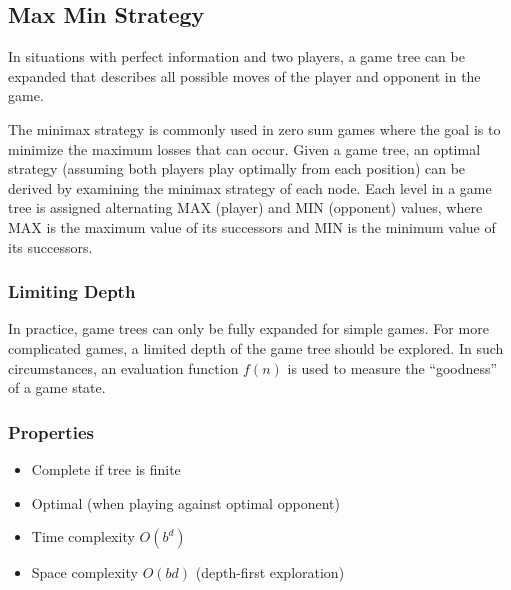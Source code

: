 \documentclass[12pt,titlepage]{article}
\begin{document}
    \subsection{Max Min Strategy}
      In situations with perfect information and two players, a game tree can be expanded that describes all possible moves of the player and opponent
      in the game.

      The minimax strategy is commonly used in zero sum games where the goal is to minimize the maximum losses that can occur. Given a game tree, an
      optimal strategy (assuming both players play optimally from each position) can be derived by examining the minimax strategy of each node. Each
      level in a game tree is assigned alternating MAX (player) and MIN (opponent) values, where MAX is the maximum value of its successors and MIN is the
      minimum value of its successors.

      \subsubsection{Limiting Depth}
        In practice, game trees can only be fully expanded for simple games. For more complicated games, a limited depth of the game tree should be explored.
        In such circumstances, an evaluation function $f(n)$ is used to measure the ``goodness'' of a game state.

      \subsubsection{Properties}
        \begin{itemize}
          \item Complete if tree is finite
          \item Optimal (when playing against optimal opponent)
          \item Time complexity $O(b^d)$
          \item Space complexity $O(bd)$ (depth-first exploration)
        \end{itemize}
\end{document}
